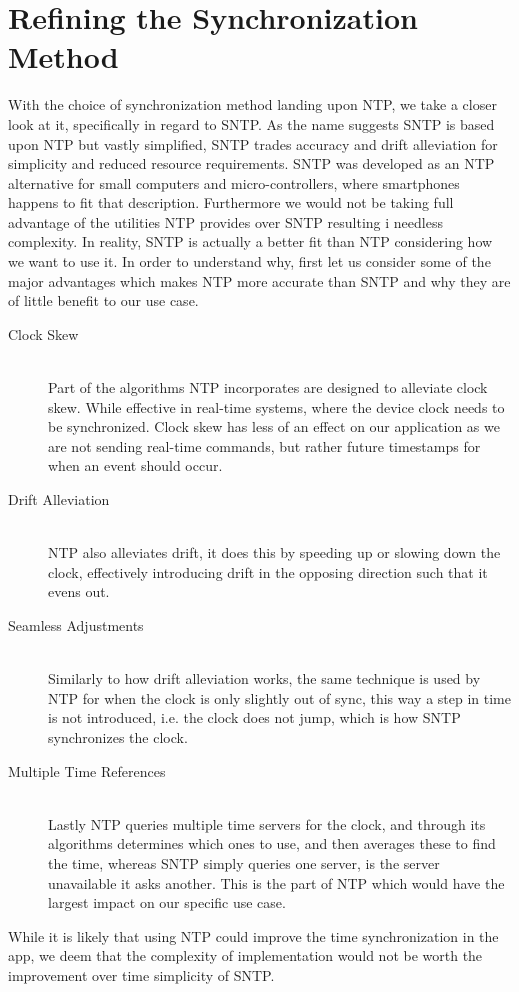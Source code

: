 \section{Refining the Synchronization Method}
With the choice of synchronization method landing upon \ac{NTP}, we take a closer look at it, specifically in regard to \ac{SNTP}.
As the name suggests \ac{SNTP} is based upon \ac{NTP} but vastly simplified, \ac{SNTP} trades accuracy and drift alleviation for simplicity and reduced resource requirements.
\ac{SNTP} was developed as an \ac{NTP} alternative for small computers and micro-controllers, where smartphones happens to fit that description.
Furthermore we would not be taking full advantage of the utilities \ac{NTP} provides over \ac{SNTP} resulting i needless complexity.
In reality, \ac{SNTP} is actually a better fit than \ac{NTP} considering how we want to use it. 
In order to understand why, first let us consider some of the major advantages which makes \ac{NTP} more accurate than \ac{SNTP} and why they are of little benefit to our use case.\cite{sntp_ntp}
\begin{description}
    \item [Clock Skew] \hfill \\
    Part of the algorithms \ac{NTP} incorporates are designed to alleviate clock skew.
    While effective in real-time systems, where the device clock needs to be synchronized. 
    Clock skew has less of an effect on our application as we are not sending real-time commands, but rather future timestamps for when an event should occur.
    \item [Drift Alleviation] \hfill \\
    \ac{NTP} also alleviates drift, it does this by speeding up or slowing down the clock, effectively introducing drift in the opposing direction such that it evens out.
    \item [Seamless Adjustments] \hfill \\
    Similarly to how drift alleviation works, the same technique is used by \ac{NTP} for when the clock is only slightly out of sync, this way a step in time is not introduced, i.e. the clock does not jump, which is how \ac{SNTP} synchronizes the clock.
    \item [Multiple Time References] \hfill \\
    Lastly \ac{NTP} queries multiple time servers for the clock, and through its algorithms determines which ones to use, and then averages these to find the time, whereas \ac{SNTP} simply queries one server, is the server unavailable it asks another.
    This is the part of \ac{NTP} which would have the largest impact on our specific use case.
\end{description}

While it is likely that using \ac{NTP} could improve the time synchronization in the app, we deem that the complexity of implementation would not be worth the improvement over time simplicity of \ac{SNTP}.
